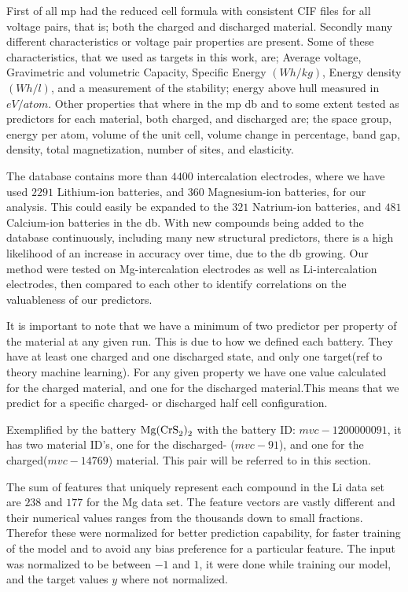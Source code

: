 	 First of all mp had the reduced cell formula with consistent CIF files for all voltage pairs, that is; both the charged and discharged material. Secondly many different characteristics or voltage pair properties are present. Some of these characteristics, that we used as targets in this work, are; Average voltage, Gravimetric and volumetric Capacity, Specific Energy $(\si{Wh/kg})$, Energy density $(\si{Wh/l} )$, and a measurement of the stability; energy above hull measured in  $\si{eV/atom}$. Other properties that where in the mp db and to some extent tested as predictors for each material, both charged, and discharged are; the space group, energy per atom, volume of the unit cell, volume change in percentage, band gap, density, total magnetization, number of sites, and elasticity. 

The database contains more than $4400$ intercalation electrodes, where we have used $2291$ Lithium-ion batteries, and $360$ Magnesium-ion batteries, for our analysis. This could easily be expanded to the $321$ Natrium-ion batteries, and $481$ Calcium-ion batteries in the db. With new compounds being added to the database continuously, including many new structural predictors, there is a high likelihood of an increase in accuracy over time, due to the db growing. Our method were tested on Mg-intercalation electrodes as well as Li-intercalation electrodes, then compared to each other to identify correlations on the valuableness of our predictors. 

	It is important to note that we have a minimum of two predictor per property of the material at any given run. This is due to how we defined each battery. They have at least one charged and one discharged state, and only one target(ref to theory machine learning). For any given property we have one value calculated for the charged material, and one for the discharged material.This means that we predict for a specific charged- or discharged half cell configuration.

	Exemplified by the battery $\ce{Mg(CrS_2)_2}$ with the battery ID: $mvc-1200000091$, it has two material ID's, one for the discharged- ($mvc-91$)\label{ex:MgCrS22-discharged}, and one for the charged($mvc-14769$) \label{ex:MgCrS22-charged} material. This pair will be referred to in this section. 
	
	The sum of features that uniquely represent each compound in the Li data set are $238$ and $177$ for the Mg data set. The feature vectors are vastly different and their numerical values ranges from the thousands down to small fractions. Therefor these were normalized for better prediction capability, for faster training of the model and to avoid any bias preference for a particular feature. The input was normalized to be between $-1$ and $1$, it were done while training our model, and the target values $y$ where not normalized. 


